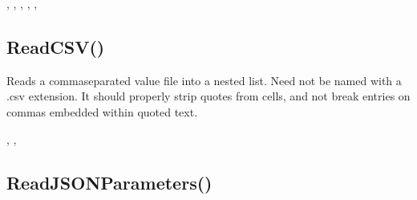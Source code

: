 \documentclass[letterpaper,10pt,english]{sphinxmanual}
\begin{document}
\sphinxAtStartPar
{}

\sphinxAtStartPar
{}, , , , ,

\ignorespaces 

\subsection{ReadCSV()}
\label{\detokenize{reference/utility:readcsv}}\label{\detokenize{reference/utility:index-33}}
\sphinxAtStartPar
{}

\sphinxAtStartPar
{}

\sphinxAtStartPar
Reads a comma\sphinxhyphen{}separated  value file into a nested   list.  Need not be named with a .csv extension.  It should properly   strip quotes from cells, and not break entries on commas embedded   within quoted text.

\sphinxAtStartPar
{}

\begin{sphinxVerbatim}[commandchars=\\\{\}]
\end{sphinxVerbatim}

\sphinxAtStartPar
{}

\begin{sphinxVerbatim}[commandchars=\\\{\}]
\end{sphinxVerbatim}

\sphinxAtStartPar
{}

\sphinxAtStartPar
{}, , 

\ignorespaces 

\subsection{ReadJSONParameters()}
\label{\detokenize{reference/utility:readjsonparameters}}\label{\detokenize{reference/utility:index-34}}
\sphinxAtStartPar
{}
\end{document}
